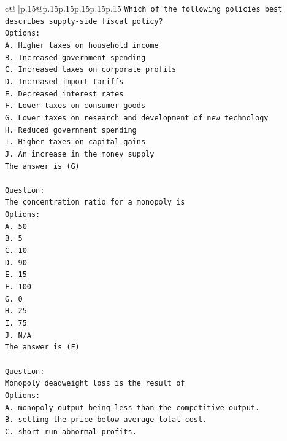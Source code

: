 \documentclass{article}
\begin{document}
{\begin{supertabular}{c@{$\;$}|p{.15\linewidth}@{}p{.15\linewidth}p{.15\linewidth}p{.15\linewidth}p{.15\linewidth}p{.15\linewidth}}
{{{\texttt{Which of the following policies best describes supply{-}side fiscal policy?} \\
\texttt{Options:} \\
\texttt{A. Higher taxes on household income} \\
\texttt{B. Increased government spending} \\
\texttt{C. Increased taxes on corporate profits} \\
\texttt{D. Increased import tariffs} \\
\texttt{E. Decreased interest rates} \\
\texttt{F. Lower taxes on consumer goods} \\
\texttt{G. Lower taxes on research and development of new technology} \\
\texttt{H. Reduced government spending} \\
\texttt{I. Higher taxes on capital gains} \\
\texttt{J. An increase in the money supply} \\
\texttt{The answer is (G)} \\
\\ 
\texttt{Question:} \\
\texttt{The concentration ratio for a monopoly is} \\
\texttt{Options:} \\
\texttt{A. 50} \\
\texttt{B. 5} \\
\texttt{C. 10} \\
\texttt{D. 90} \\
\texttt{E. 15} \\
\texttt{F. 100} \\
\texttt{G. 0} \\
\texttt{H. 25} \\
\texttt{I. 75} \\
\texttt{J. N/A} \\
\texttt{The answer is (F)} \\
\\ 
\texttt{Question:} \\
\texttt{Monopoly deadweight loss is the result of} \\
\texttt{Options:} \\
\texttt{A. monopoly output being less than the competitive output.} \\
\texttt{B. setting the price below average total cost.} \\
\texttt{C. short{-}run abnormal profits.} \\
}}}
\end{supertabular}}
\end{document}
